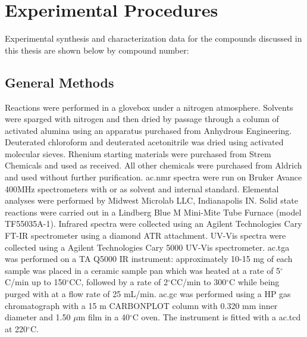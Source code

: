\chapter{Experimental Procedures} \label{chap.exp}

Experimental synthesis and characterization data for the compounds discussed in this thesis are shown below by compound number:

\section{General Methods} \label{sec:.genmethods}
Reactions were performed in a glovebox under a nitrogen atmosphere. Solvents were sparged with nitrogen and then dried by passage through a column of activated alumina using an apparatus purchased from Anhydrous Engineering. Deuterated chloroform and deuterated acetonitrile was dried using activated molecular sieves. Rhenium starting materials were purchased from Strem Chemicals and used as received. All other chemicals were purchased from Aldrich and used without further purification. \Gls{ac.nmr} spectra were run on Bruker Avance 400MHz spectrometers with  or  as solvent and internal standard. Elemental analyses were performed by Midwest Microlab LLC, Indianapolis IN. Solid state reactions were carried out in a Lindberg Blue M Mini-Mite Tube Furnace (model TF55035A-1). Infrared spectra were collected using an Agilent Technologies Cary FT-IR spectrometer using a diamond ATR attachment. UV-Vis spectra were collected using a Agilent Technologies Cary 5000 UV-Vis spectrometer. \Gls{ac.tga} was performed on a TA Q5000 IR instrument: approximately 10-15 mg of each sample was placed in a ceramic sample pan which was heated at a rate of 5$^\circ$C/min up to 150$^\circ$CC, followed by a rate of 2$^\circ$CC/min to 300$^\circ$C while being purged with  at a flow rate of 25 mL/min. \Gls{ac.gc} was performed using a HP gas chromatograph with a 15 m CARBONPLOT column with 0.320 mm inner diameter and 1.50 $\mu$m film in a 40$^\circ$C oven. The instrument is fitted with a \gls{ac.tcd} at 220$^\circ$C.

